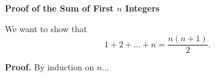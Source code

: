 \begin{center}
\textbf{Proof of the Sum of First $n$ Integers}
\end{center}

We want to show that
\[
1 + 2 + \dots + n = \frac{n(n+1)}{2}.
\]

\textbf{Proof.}
By induction on $n$...

